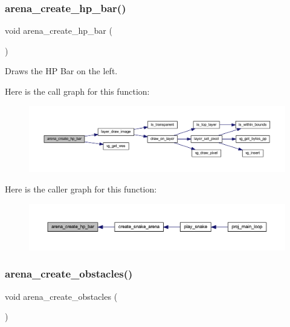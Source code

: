 \subsubsection{\texorpdfstring{arena\+\_\+create\+\_\+hp\+\_\+bar()}{arena\_create\_hp\_bar()}}
{\footnotesize\ttfamily void arena\+\_\+create\+\_\+hp\+\_\+bar (\begin{DoxyParamCaption}{ }\end{DoxyParamCaption})}



Draws the HP Bar on the left. 

Here is the call graph for this function\+:\nopagebreak
\begin{figure}[H]
\begin{center}
\leavevmode
\includegraphics[width=350pt]{group__snake_gafed6f3f803dcd50302e1e669d6646eca_cgraph}
\end{center}
\end{figure}
Here is the caller graph for this function\+:\nopagebreak
\begin{figure}[H]
\begin{center}
\leavevmode
\includegraphics[width=350pt]{group__snake_gafed6f3f803dcd50302e1e669d6646eca_icgraph}
\end{center}
\end{figure}
\mbox{\label{group__snake_ga0023b72115390a70c136c27bcd0f7844}} 
\subsubsection{\texorpdfstring{arena\+\_\+create\+\_\+obstacles()}{arena\_create\_obstacles()}}
{\footnotesize\ttfamily void arena\+\_\+create\+\_\+obstacles (\begin{DoxyParamCaption}{ }\end{DoxyParamCaption})}



